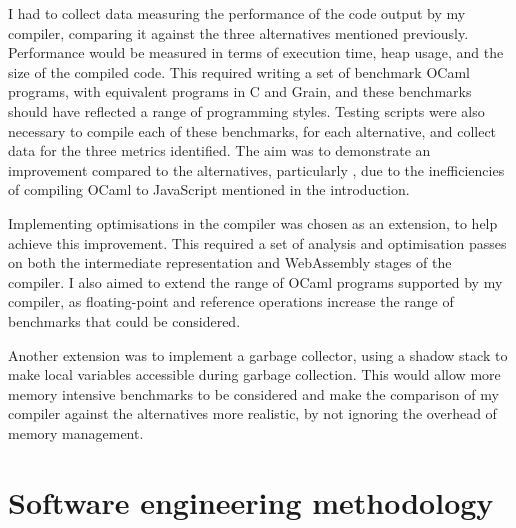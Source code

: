 I had to collect data measuring the performance of the code output by my compiler, comparing it against the three alternatives mentioned previously. Performance would be measured in terms of execution time, heap usage, and the size of the compiled code. This required writing a set of benchmark OCaml programs, with equivalent programs in C and Grain, and these benchmarks should have reflected a range of programming styles. Testing scripts were also necessary to compile each of these benchmarks, for each alternative, and collect data for the three metrics identified. The aim was to demonstrate an improvement compared to the alternatives, particularly \jsofocaml{}, due to the inefficiencies of compiling OCaml to JavaScript mentioned in the introduction.



Implementing optimisations in the compiler was chosen as an extension, to help achieve this improvement. This required a set of analysis and optimisation passes on both the intermediate representation and WebAssembly stages of the compiler. I also aimed to extend the range of OCaml programs supported by my compiler, as floating-point and reference operations increase the range of benchmarks that could be considered. %

Another extension was to implement a garbage collector, using a shadow stack to make local variables accessible during garbage collection. This would allow more memory intensive benchmarks to be considered and make the comparison of my compiler against the alternatives more realistic, by not ignoring the overhead of memory management. %



\section{Software engineering methodology}

